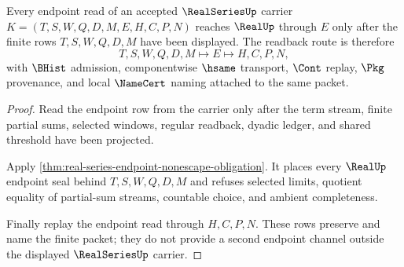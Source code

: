 \begin{theorem}
\label{thm:realseries-endpoint-readback}
Every endpoint read of an accepted $\RealSeriesUp$ carrier $K=(T,S,W,Q,D,M,E,H,C,P,N)$ reaches $\RealUp$ through $E$ only after the finite rows $T,S,W,Q,D,M$ have been displayed. The readback route is therefore
$$
T,S,W,Q,D,M \longmapsto E \longmapsto H,C,P,N,
$$
with $\BHist$ admission, componentwise $\hsame$ transport, $\Cont$ replay, $\Pkg$ provenance, and local $\NameCert$ naming attached to the same packet.
\end{theorem}
\begin{proof}
Read the endpoint row from the carrier only after the term stream, finite partial sums, selected windows, regular readback, dyadic ledger, and shared threshold have been projected.

Apply \autoref{thm:real-series-endpoint-nonescape-obligation}. It places every $\RealUp$ endpoint seal behind $T,S,W,Q,D,M$ and refuses selected limits, quotient equality of partial-sum streams, countable choice, and ambient completeness.

Finally replay the endpoint read through $H,C,P,N$. These rows preserve and name the finite packet; they do not provide a second endpoint channel outside the displayed $\RealSeriesUp$ carrier.
\end{proof}

